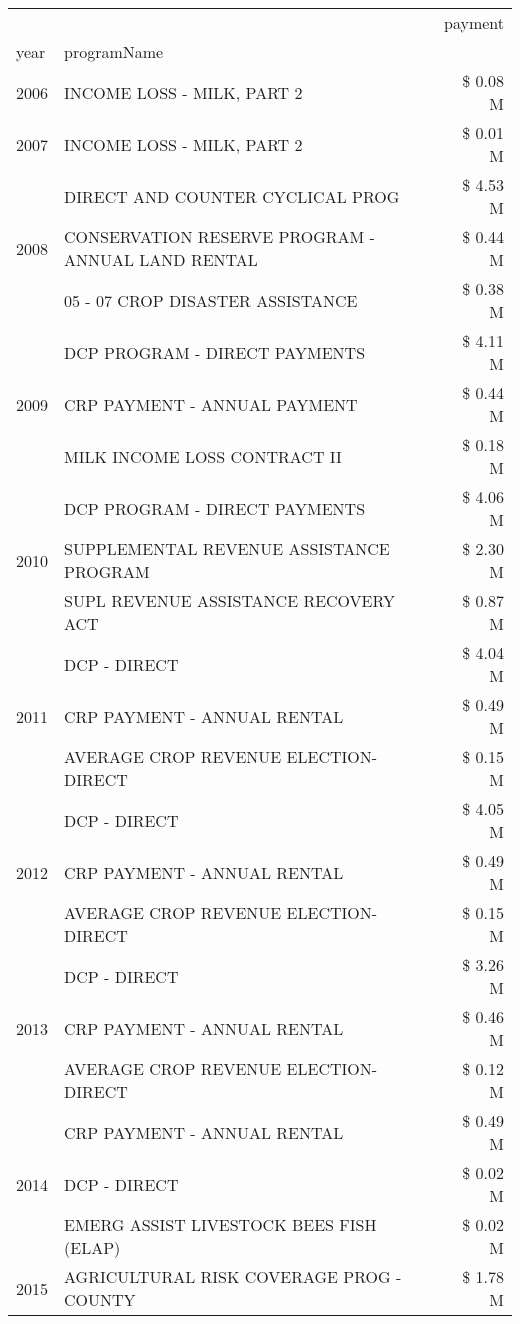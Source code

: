 \begin{tabular}{llr}
\toprule
 &  & payment \\
year & programName &  \\
\midrule
2006 & INCOME LOSS - MILK, PART 2 & \$ 0.08 M \\
\cline{1-3}
2007 & INCOME LOSS - MILK, PART 2 & \$ 0.01 M \\
\cline{1-3}
\multirow[t]{3}{*}{2008} & DIRECT AND COUNTER CYCLICAL PROG & \$ 4.53 M \\
 & CONSERVATION RESERVE PROGRAM - ANNUAL LAND RENTAL & \$ 0.44 M \\
 & 05 - 07 CROP DISASTER ASSISTANCE & \$ 0.38 M \\
\cline{1-3}
\multirow[t]{3}{*}{2009} & DCP PROGRAM - DIRECT PAYMENTS & \$ 4.11 M \\
 & CRP PAYMENT - ANNUAL PAYMENT & \$ 0.44 M \\
 & MILK INCOME LOSS CONTRACT II & \$ 0.18 M \\
\cline{1-3}
\multirow[t]{3}{*}{2010} & DCP PROGRAM - DIRECT PAYMENTS & \$ 4.06 M \\
 & SUPPLEMENTAL REVENUE ASSISTANCE PROGRAM & \$ 2.30 M \\
 & SUPL REVENUE ASSISTANCE RECOVERY ACT & \$ 0.87 M \\
\cline{1-3}
\multirow[t]{3}{*}{2011} & DCP - DIRECT & \$ 4.04 M \\
 & CRP PAYMENT - ANNUAL RENTAL & \$ 0.49 M \\
 & AVERAGE CROP REVENUE ELECTION-DIRECT & \$ 0.15 M \\
\cline{1-3}
\multirow[t]{3}{*}{2012} & DCP - DIRECT & \$ 4.05 M \\
 & CRP PAYMENT - ANNUAL RENTAL & \$ 0.49 M \\
 & AVERAGE CROP REVENUE ELECTION-DIRECT & \$ 0.15 M \\
\cline{1-3}
\multirow[t]{3}{*}{2013} & DCP - DIRECT & \$ 3.26 M \\
 & CRP PAYMENT - ANNUAL RENTAL & \$ 0.46 M \\
 & AVERAGE CROP REVENUE ELECTION-DIRECT & \$ 0.12 M \\
\cline{1-3}
\multirow[t]{3}{*}{2014} & CRP PAYMENT - ANNUAL RENTAL & \$ 0.49 M \\
 & DCP - DIRECT & \$ 0.02 M \\
 & EMERG ASSIST LIVESTOCK BEES FISH (ELAP) & \$ 0.02 M \\
\cline{1-3}
\multirow[t]{3}{*}{2015} & AGRICULTURAL RISK COVERAGE PROG - COUNTY & \$ 1.78 M \\

\end{tabular}
